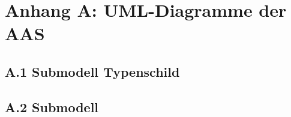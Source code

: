 \newpage
\section{Anhang A: UML-Diagramme der AAS}
\subsection{A.1 Submodell Typenschild}
\subsection{A.2 Submodell}